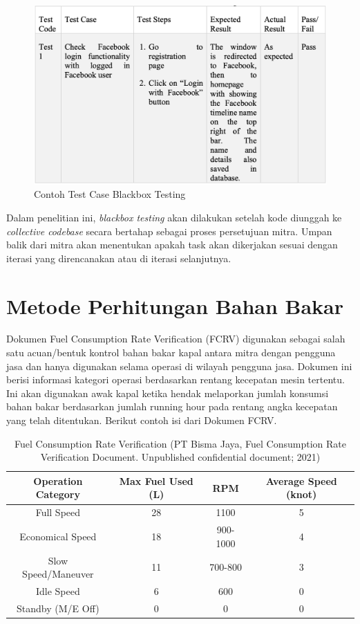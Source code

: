 \begin{figure}[!h]
    \includegraphics[width=.8\linewidth, center]{images/tinjauan-pustaka/fig-blackbox-eg.png}
    \caption{Contoh Test Case Blackbox Testing \parencite{ thesis:rahman}}
    \label{fig:blackbox-example}
\end{figure}

Dalam penelitian ini, \textit{blackbox testing} akan dilakukan setelah kode diunggah ke \textit{collective codebase} secara bertahap sebagai proses persetujuan mitra. Umpan balik dari mitra akan menentukan apakah task akan dikerjakan sesuai dengan iterasi yang direncanakan atau di iterasi selanjutnya.

\section{Metode Perhitungan Bahan Bakar}\label{sec:fcrv}

Dokumen Fuel Consumption Rate Verification (FCRV) digunakan sebagai salah satu acuan/bentuk kontrol bahan bakar kapal antara mitra dengan pengguna jasa dan hanya digunakan selama operasi di wilayah pengguna jasa. Dokumen ini berisi informasi kategori operasi berdasarkan rentang kecepatan mesin tertentu. Ini akan digunakan awak kapal ketika hendak melaporkan jumlah konsumsi bahan bakar berdasarkan jumlah running hour pada rentang angka kecepatan yang telah ditentukan. Berikut contoh isi dari Dokumen FCRV.

\begin{table}[!h]
    \caption{ Fuel Consumption Rate Verification (PT Bisma Jaya, Fuel Consumption Rate Verification Document. Unpublished confidential document; 2021)}
    \centering
     \begin{tabular}{c c c c}
        \toprule
        Operation Category &
        Max Fuel Used (L) &
        RPM &
        Average Speed (knot) \\ [0.5ex]
        \midrule
        Full Speed          & 28    & 1100      & 5 \\
        Economical Speed    & 18    & 900-1000  & 4 \\
        Slow Speed/Maneuver & 11    & 700-800   & 3 \\
        Idle Speed          & 6     & 600       & 0 \\
        Standby (M/E Off)   & 0     & 0         & 0 \\ [1ex]
        \bottomrule
    \end{tabular}
     \label{tab:fcrv}
\end{table}

